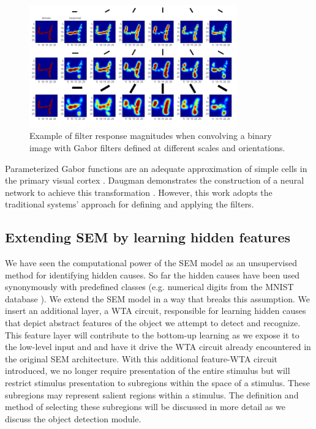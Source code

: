 \documentclass{report}
\begin{document}
\begin{figure}[ht]
\centering
\includegraphics[width=0.8\textwidth]{response4}
\caption{Example of filter response magnitudes when convolving a binary image with Gabor filters defined at different scales and orientations.
\label{fig:response4}}
\end{figure}

Parameterized Gabor functions are an adequate approximation of simple cells in the primary visual cortex \cite{Serre2004}. Daugman demonstrates the construction of a neural network to achieve this transformation \cite{Daugman1988}. However, this work adopts the traditional systems' approach for defining and applying the filters.

\subsection{Extending SEM by learning hidden features}

We have seen the computational power of the SEM model as an unsupervised method for identifying hidden causes. So far the hidden causes have been used synonymously with predefined classes (e.g. numerical digits from the MNIST database \cite{LeCun1998}). We extend the SEM model in a way that breaks this assumption. We insert an additional layer, a WTA circuit, responsible for learning hidden causes that depict abstract features of the object we attempt to detect and recognize. This feature layer will contribute to the bottom-up learning as we expose it to the low-level input and and have it drive the WTA circuit already encountered in the original SEM architecture. With this additional feature-WTA circuit introduced, we no longer require presentation of the entire stimulus but will restrict stimulus presentation to subregions within the space of a stimulus. These subregions may represent salient regions within a stimulus. The definition and method of selecting these subregions will be discussed in more detail as we discuss the object detection module.
\end{document}
